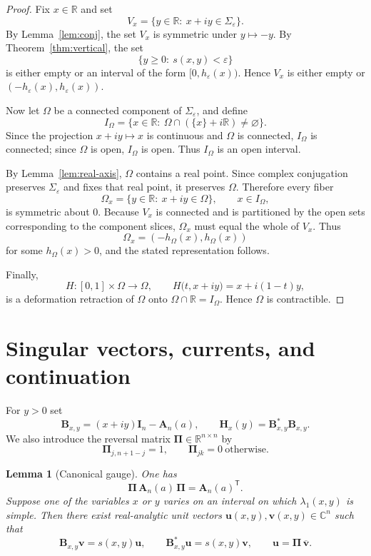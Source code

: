 \documentclass[11pt]{article}
\numberwithin{equation}{section}
\newtheorem{lemma}[theorem]{Lemma}
\begin{document}
\begin{proof}
Fix $x\in\mathbb{R}$ and set
\[
V_x=\{y\in\mathbb{R}:\ x+iy\in\Sigma_\varepsilon\}.
\]
By Lemma~\ref{lem:conj}, the set $V_x$ is symmetric under $y\mapsto -y$.
By Theorem~\ref{thm:vertical}, the set
\[
\{y\ge 0:\ s(x,y)<\varepsilon\}
\]
is either empty or an interval of the form $[0,h_\varepsilon(x))$.
Hence $V_x$ is either empty or $(-h_\varepsilon(x),h_\varepsilon(x))$.

Now let $\Omega$ be a connected component of $\Sigma_\varepsilon$, and define
\[
I_\Omega
=
\{x\in\mathbb{R}:\ \Omega\cap(\{x\}+i\mathbb{R})\neq\varnothing\}.
\]
Since the projection $x+iy\mapsto x$ is continuous and $\Omega$ is connected,
$I_\Omega$ is connected; since $\Omega$ is open, $I_\Omega$ is open.  Thus
$I_\Omega$ is an open interval.

By Lemma~\ref{lem:real-axis}, $\Omega$ contains a real point.  Since complex
conjugation preserves $\Sigma_\varepsilon$ and fixes that real point, it preserves
$\Omega$.  Therefore every fiber
\[
\Omega_x=\{y\in\mathbb{R}:\ x+iy\in\Omega\},\qquad x\in I_\Omega,
\]
is symmetric about $0$.  Because $V_x$ is connected and is partitioned by
the open sets corresponding to the component slices, $\Omega_x$ must equal
the whole of $V_x$.  Thus
\[
\Omega_x=(-h_\Omega(x),h_\Omega(x))
\]
for some $h_\Omega(x)>0$, and the stated representation follows.

Finally,
\[
H:[0,1]\times \Omega\longrightarrow \Omega,
\qquad
H\bigl(t,x+iy\bigr)=x+i(1-t)y,
\]
is a deformation retraction of $\Omega$ onto $\Omega\cap\mathbb{R}=I_\Omega$.
Hence $\Omega$ is contractible.
\end{proof}

\section{Singular vectors, currents, and continuation}\label{sec:singular}

For $y>0$ set
\[
\mathbf B_{x,y}=(x+iy)\mathbf I_n-\mathbf A_n(a),
\qquad
\mathbf H_x(y)=\mathbf B_{x,y}^*\mathbf B_{x,y}.
\]
We also introduce the reversal matrix $\bm{\Pi}\in\mathbb{R}^{n\times n}$ by
\[
\bm{\Pi}_{j,n+1-j}=1,\qquad \bm{\Pi}_{jk}=0\ \text{otherwise}.
\]

\begin{lemma}[Canonical gauge]\label{lem:canonical}
One has
\[
\bm{\Pi}\,\mathbf A_n(a)\,\bm{\Pi}=\mathbf A_n(a)^{\mathsf T}.
\]
Suppose one of the variables $x$ or $y$ varies on an interval on which
$\lambda_1(x,y)$ is simple.  Then there exist real-analytic unit vectors
$\bm u(x,y),\bm v(x,y)\in\mathbb{C}^n$ such that
\[
\mathbf B_{x,y}\bm v=s(x,y)\bm u,
\qquad
\mathbf B_{x,y}^*\bm u=s(x,y)\bm v,
\qquad
\bm u=\bm{\Pi}\,\overline{\bm v}.
\]
\end{lemma}
\end{document}
